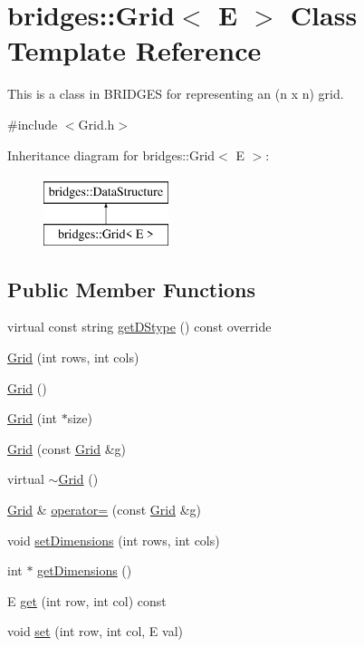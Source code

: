 \hypertarget{classbridges_1_1_grid}{}\section{bridges\+:\+:Grid$<$ E $>$ Class Template Reference}
\label{classbridges_1_1_grid}


This is a class in B\+R\+I\+D\+G\+ES for representing an (n x n) grid.  




{\ttfamily \#include $<$Grid.\+h$>$}

Inheritance diagram for bridges\+:\+:Grid$<$ E $>$\+:\begin{figure}[H]
\begin{center}
\leavevmode
\includegraphics[height=2.000000cm]{classbridges_1_1_grid}
\end{center}
\end{figure}
\subsection*{Public Member Functions}
\begin{DoxyCompactItemize}
\item 
virtual const string \mbox{\hyperlink{classbridges_1_1_grid_ab701d081de4f7ffafb15966758dd5446}{get\+D\+Stype}} () const override
\item 
\mbox{\hyperlink{classbridges_1_1_grid_af8bb9244c4c713f2325af6d4754ad1e9}{Grid}} (int rows, int cols)
\item 
\mbox{\hyperlink{classbridges_1_1_grid_a711e05a933c2a11c9e2775c74e6cf80d}{Grid}} ()
\item 
\mbox{\hyperlink{classbridges_1_1_grid_ad5c6c5e87eb40446ac794c5479937f87}{Grid}} (int $\ast$size)
\item 
\mbox{\hyperlink{classbridges_1_1_grid_aff3e633c9454fbc66cab5ffe0c6812db}{Grid}} (const \mbox{\hyperlink{classbridges_1_1_grid}{Grid}} \&g)
\item 
virtual \mbox{\hyperlink{classbridges_1_1_grid_a46cc94397ea38211349b10e3629b2590}{$\sim$\+Grid}} ()
\item 
\mbox{\hyperlink{classbridges_1_1_grid}{Grid}} \& \mbox{\hyperlink{classbridges_1_1_grid_ad5b960f574d1f5bddfffbfd8ce2d870b}{operator=}} (const \mbox{\hyperlink{classbridges_1_1_grid}{Grid}} \&g)
\item 
void \mbox{\hyperlink{classbridges_1_1_grid_a8e5e4d92097f9d1481a14219eb5cc5a8}{set\+Dimensions}} (int rows, int cols)
\item 
int $\ast$ \mbox{\hyperlink{classbridges_1_1_grid_ad21e4fc94483ef822fda9b74a52b9f48}{get\+Dimensions}} ()
\item 
E \mbox{\hyperlink{classbridges_1_1_grid_a0f8ef03d9b64732f69a9dc8c240df5da}{get}} (int row, int col) const
\item 
void \mbox{\hyperlink{classbridges_1_1_grid_acd750e5886349488257aba85f0b06f6f}{set}} (int row, int col, E val)
\end{DoxyCompactItemize}
